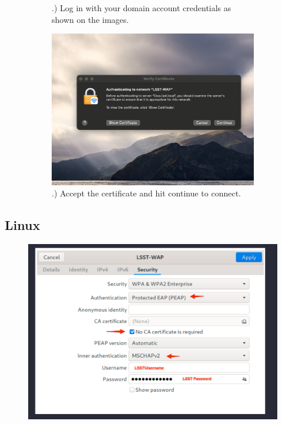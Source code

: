 \begin{figure}
\begin{subfigure}{0.40\textwidth}
      .) Log in with your domain account credentials as shown on the images.
    \end{subfigure}
      \hfill
      \vspace{7mm}
    \begin{subfigure}{0.50\textwidth}
      \includegraphics[width=\textwidth]{Images/Mac4.png}
      .) Accept the certificate and hit continue to connect.
    \end{subfigure}
  \end{figure}

\newpage
  
  \vspace{20mm}
  \subsection{Linux}
  \begin{figure}
    \includegraphics[width=150mm]{Images/Linux2.png}
    \centering 
  \end{figure}

